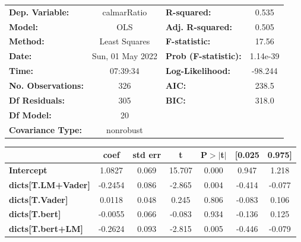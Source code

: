 \begin{center}
\begin{tabular}{lclc}
\toprule
\textbf{Dep. Variable:}              &   calmarRatio    & \textbf{  R-squared:         } &     0.535   \\
\textbf{Model:}                      &       OLS        & \textbf{  Adj. R-squared:    } &     0.505   \\
\textbf{Method:}                     &  Least Squares   & \textbf{  F-statistic:       } &     17.56   \\
\textbf{Date:}                       & Sun, 01 May 2022 & \textbf{  Prob (F-statistic):} &  1.14e-39   \\
\textbf{Time:}                       &     07:39:34     & \textbf{  Log-Likelihood:    } &   -98.244   \\
\textbf{No. Observations:}           &         326      & \textbf{  AIC:               } &     238.5   \\
\textbf{Df Residuals:}               &         305      & \textbf{  BIC:               } &     318.0   \\
\textbf{Df Model:}                   &          20      & \textbf{                     } &             \\
\textbf{Covariance Type:}            &    nonrobust     & \textbf{                     } &             \\
\bottomrule
\end{tabular}
\begin{tabular}{lcccccc}
                                     & \textbf{coef} & \textbf{std err} & \textbf{t} & \textbf{P$> |$t$|$} & \textbf{[0.025} & \textbf{0.975]}  \\
\midrule
\textbf{Intercept}                   &       1.0827  &        0.069     &    15.707  &         0.000        &        0.947    &        1.218     \\
\textbf{dicts[T.LM+Vader]}           &      -0.2454  &        0.086     &    -2.865  &         0.004        &       -0.414    &       -0.077     \\
\textbf{dicts[T.Vader]}              &       0.0118  &        0.048     &     0.245  &         0.806        &       -0.083    &        0.106     \\
\textbf{dicts[T.bert]}               &      -0.0055  &        0.066     &    -0.083  &         0.934        &       -0.136    &        0.125     \\
\textbf{dicts[T.bert+LM]}            &      -0.2624  &        0.093     &    -2.815  &         0.005        &       -0.446    &       -0.079     \\

\end{tabular}
\end{center}
